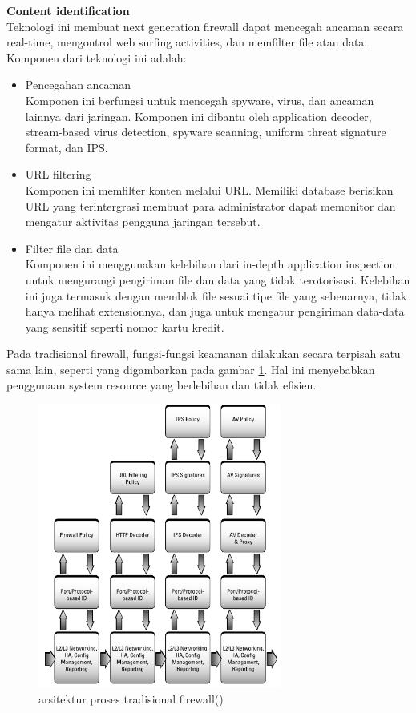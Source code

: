 \noindent\textbf{Content identification}\\
Teknologi ini membuat next generation firewall dapat mencegah ancaman secara real-time, mengontrol web surfing activities, dan memfilter file atau data. Komponen dari teknologi ini adalah:
\begin{itemize}
	\item Pencegahan ancaman\\
	Komponen ini berfungsi untuk mencegah spyware, virus, dan ancaman lainnya dari jaringan. Komponen ini dibantu oleh application decoder, stream-based virus detection, spyware scanning, uniform threat signature format, dan IPS.
	\item URL filtering\\
	Komponen ini memfilter konten melalui URL. Memiliki database berisikan URL yang terintergrasi membuat para administrator dapat memonitor dan mengatur aktivitas pengguna jaringan tersebut. 
	\item Filter file dan data\\
	Komponen ini menggunakan kelebihan dari in-depth application inspection untuk mengurangi pengiriman file dan data yang tidak terotorisasi. Kelebihan ini juga termasuk dengan memblok file sesuai tipe file yang sebenarnya, tidak hanya melihat extensionnya, dan juga untuk mengatur pengiriman data-data yang sensitif seperti nomor kartu kredit. 
\end{itemize}

Pada tradisional firewall, fungsi-fungsi keamanan dilakukan secara terpisah satu sama lain, seperti yang digambarkan pada gambar \ref{fig:architecture_tradisional_firewall}. Hal ini menyebabkan penggunaan system resource yang berlebihan dan tidak efisien.
\begin{figure}[H]
	\centering
	\includegraphics[width=8cm]{resources/architecture_tradisional_firewall.png}
	\caption{arsitektur proses tradisional firewall(\cite{miller2011next})}
	\label{fig:architecture_tradisional_firewall}
\end{figure}

